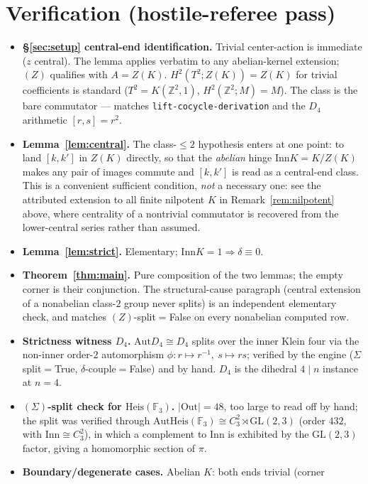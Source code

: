 \documentclass[11pt]{article}
\theoremstyle{definition}
\newcommand{\Z}{\mathbb{Z}}
\newcommand{\F}{\mathbb{F}}
\newcommand{\Aut}{\mathrm{Aut}}
\newcommand{\Inn}{\mathrm{Inn}}
\newcommand{\Out}{\mathrm{Out}}
\newcommand{\Heis}{\mathrm{Heis}}
\begin{document}
\section{Verification (hostile-referee pass)}\label{sec:verification}

\begin{itemize}
\item \textbf{\S\ref{sec:setup} central-end identification.} Trivial center-action is immediate
($z$ central). The lemma applies verbatim to any abelian-kernel extension; $(Z)$ qualifies with
$A=Z(K)$. $H^2(T^2;Z(K))=Z(K)$ for trivial coefficients is standard ($T^2=K(\Z^2,1)$,
$H^2(\Z^2;M)=M$). The class is the bare commutator --- matches
\texttt{lift-cocycle-derivation} and the $D_4$ arithmetic $[r,s]=r^2$.
\item \textbf{Lemma~\ref{lem:central}.} The class-$\le2$ hypothesis enters at one point: to land
$[k,k']$ in $Z(K)$ directly, so that the \emph{abelian} hinge $\Inn K=K/Z(K)$ makes any pair of
images commute and $[k,k']$ is read as a central-end class. This is a convenient sufficient
condition, \emph{not} a necessary one: see the attributed extension to all finite nilpotent $K$
in Remark~\ref{rem:nilpotent} above, where centrality of a nontrivial commutator is recovered
from the lower-central series rather than assumed.
\item \textbf{Lemma~\ref{lem:strict}.} Elementary; $\Inn K=1\Rightarrow\delta\equiv0$.
\item \textbf{Theorem~\ref{thm:main}.} Pure composition of the two lemmas; the empty corner is
their conjunction. The structural-cause paragraph (central extension of a nonabelian class-$2$
group never splits) is an independent elementary check, and matches $(Z)$-split$=$False on
every nonabelian computed row.
\item \textbf{Strictness witness $D_4$.} $\Aut D_4\cong D_4$ splits over the inner Klein four
via the non-inner order-$2$ automorphism $\phi:r\mapsto r^{-1},\ s\mapsto rs$; verified by the
engine ($\Sigma$ split$=$True, $\delta$-couple$=$False) and by hand. $D_4$ is the dihedral
$4\mid n$ instance at $n=4$.
\item \textbf{$(\Sigma)$-split check for $\Heis(\F_3)$.} $|\Out|=48$, too large to read off by
hand; the split was verified through $\Aut\Heis(\F_3)\cong C_3^2\rtimes\mathrm{GL}(2,3)$ (order
$432$, with $\Inn\cong C_3^2$), in which a complement to $\Inn$ is exhibited by the
$\mathrm{GL}(2,3)$ factor, giving a homomorphic section of $\pi$.
\item \textbf{Boundary/degenerate cases.} Abelian $K$: both ends trivial (corner

\end{itemize}
\end{document}
